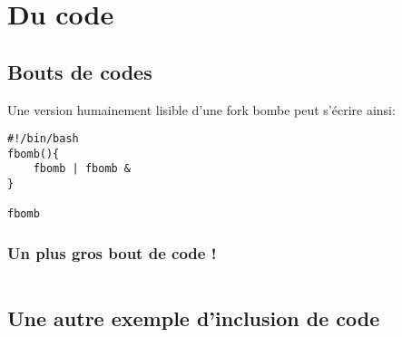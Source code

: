 \section{Du code}
\subsection{Bouts de codes}
Une version humainement lisible d'une fork bombe peut s'écrire ainsi:
\begin{verbatim}
#!/bin/bash
fbomb(){
    fbomb | fbomb &
}

fbomb
\end{verbatim}

\subsubsection{Un plus gros bout de code !}
\inputminted{python}{src/parts/code/example.py}
\newpage

\subsection{Une autre exemple d'inclusion de code}



    
    